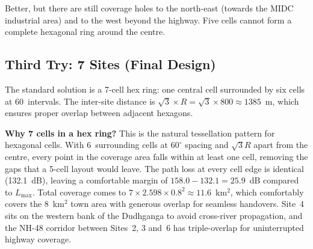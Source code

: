 \documentclass[10pt,a4paper,twocolumn]{article}
\begin{document}
Better, but there are still coverage holes to the north-east (towards the MIDC industrial area) and to the west beyond the highway. Five cells cannot form a complete hexagonal ring around the centre.

\subsection{Third Try: 7 Sites (Final Design)}

The standard solution is a 7-cell hex ring: one central cell surrounded by six cells at 60\textdegree\ intervals. The inter-site distance is $\sqrt{3} \times R = \sqrt{3} \times 800 \approx 1385$~m, which ensures proper overlap between adjacent hexagons.

\begin{table}[H]
\centering
\caption{Final 7-Site Network (uniform $R = 800$~m)}
\label{tab:final_design}
%
\end{table}

\textbf{Why 7 cells in a hex ring?} This is the natural tessellation pattern for hexagonal cells. With 6~surrounding cells at $60^\circ$ spacing and $\sqrt{3}R$ apart from the centre, every point in the coverage area falls within at least one cell, removing the gaps that a 5-cell layout would leave. The path loss at every cell edge is identical (132.1~dB), leaving a comfortable margin of $158.0 - 132.1 = 25.9$~dB compared to $L_{\max}$. Total coverage comes to $7 \times 2.598 \times 0.8^2 \approx 11.6$~km$^2$, which comfortably covers the 8~km$^2$ town area with generous overlap for seamless handovers. Site~4 sits on the western bank of the Dudhganga to avoid cross-river propagation, and the NH-48 corridor between Sites~2, 3 and~6 has triple-overlap for uninterrupted highway coverage.
\end{document}
